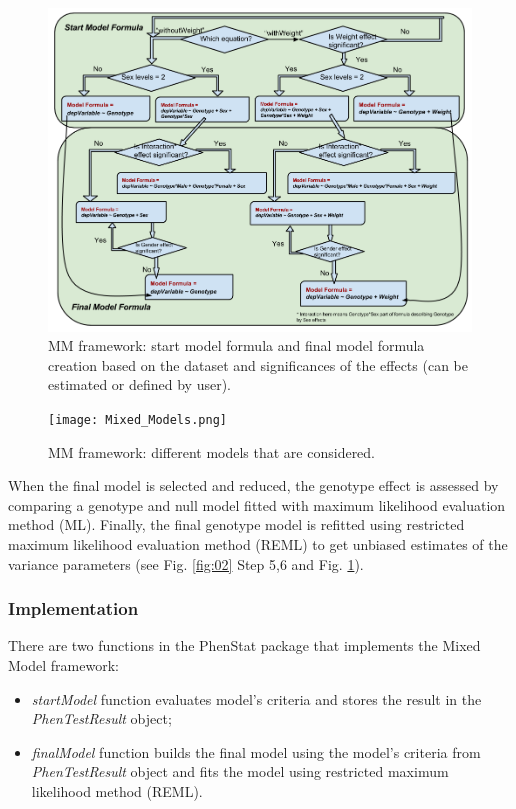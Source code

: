 \documentclass[12pt,a4paper]{article}
\begin{document}
\begin{figure}[!tpb]%
\centerline{\includegraphics[scale=0.5]{Model_Formula.png}}
\caption{MM framework: start model formula and final model formula creation based on the dataset and significances of the effects (can be estimated or defined by user). }\label{fig:03}
\end{figure}

\begin{figure}[!tpb]%
\centerline{\texttt{[image: Mixed\_Models.png]}}
\caption{MM framework: different models that are considered. }\label{fig:04}
\end{figure}

When the final model is selected and reduced, the genotype effect is assessed by comparing a genotype and null model fitted with maximum likelihood evaluation method (ML). Finally, the final genotype model is refitted using restricted maximum likelihood evaluation method (REML) to get unbiased estimates of the variance parameters (see Fig. \ref{fig:02} Step 5,6 and Fig. \ref{fig:03}).   

\subsubsection{Implementation}
\label{sec:MMImplementation}
There are two functions in the PhenStat package that implements the Mixed Model framework:
\begin{itemize}
\item \textit{startModel} function evaluates model's criteria and stores the result in the \textit{PhenTestResult} object;
\item \textit{finalModel} function builds the final model using the model's criteria from \textit{PhenTestResult} object and fits the model using restricted maximum likelihood method (REML). 
\end{itemize}
\end{document}
